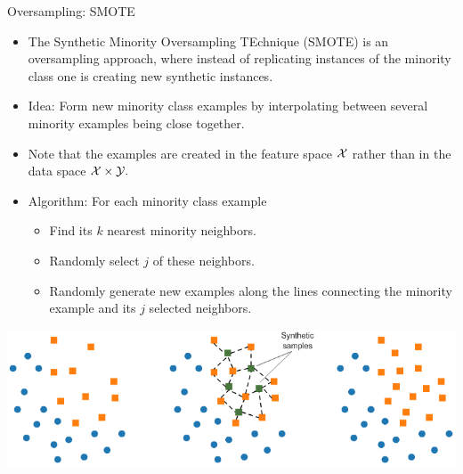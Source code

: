 \documentclass[11pt,compress,t,notes=noshow, xcolor=table]{beamer}
\begin{document}
	\begin{frame}{Oversampling: SMOTE}
		\footnotesize
		\begin{itemize}
			\item The Synthetic Minority Oversampling TEchnique (SMOTE) is an oversampling approach, where instead of replicating instances of the minority class one is creating new synthetic instances.
%			
			\item Idea: Form new minority class examples by interpolating between several minority examples being close together.
			\item Note that the examples are created in the feature space $\mathcal{X}$ rather than in the data space $\mathcal{X}\times\mathcal{Y}.$
%			
			\item Algorithm: For each minority class example 
%			
			\begin{itemize} \footnotesize
%				
				\item Find its $k$ nearest minority neighbors.
%				
				\item Randomly select $j$ of these neighbors.
%				
				\item Randomly generate new examples along the lines connecting the minority example and its $j$ selected neighbors.
%				
			\end{itemize}
		\end{itemize}
%	
		\includegraphics{figure/SMOTE.png} 
	\end{frame}
	
\end{document}
